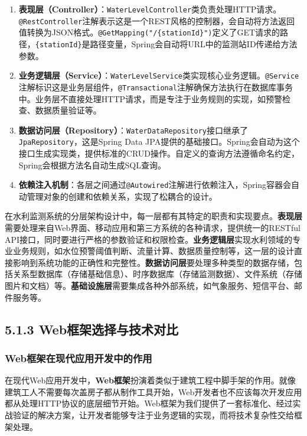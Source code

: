 \begin{enumerate}
\def\labelenumi{\arabic{enumi}.}
\item
  \textbf{表现层（Controller）}：\texttt{WaterLevelController}类负责处理HTTP请求。\texttt{@RestController}注解表示这是一个REST风格的控制器，会自动将方法返回值转换为JSON格式。\texttt{@GetMapping("/\{stationId\}")}定义了GET请求的路径，\texttt{\{stationId\}}是路径变量，Spring会自动将URL中的监测站ID传递给方法参数。
\item
  \textbf{业务逻辑层（Service）}：\texttt{WaterLevelService}类实现核心业务逻辑。\texttt{@Service}注解标识这是业务层组件，\texttt{@Transactional}注解确保方法执行在数据库事务中。业务层不直接处理HTTP请求，而是专注于业务规则的实现，如预警检查、数据质量验证等。
\item
  \textbf{数据访问层（Repository）}：\texttt{WaterDataRepository}接口继承了\texttt{JpaRepository}，这是Spring Data JPA提供的基础接口。Spring会自动为这个接口生成实现类，提供标准的CRUD操作。自定义的查询方法遵循命名约定，Spring会根据方法名自动生成SQL查询。
\item
  \textbf{依赖注入机制}：各层之间通过\texttt{@Autowired}注解进行依赖注入，Spring容器会自动管理对象的创建和依赖关系，实现了松耦合的设计。
\end{enumerate}

在水利监测系统的分层架构设计中，每一层都有其特定的职责和实现要点。\textbf{表现层}需要处理来自Web界面、移动应用和第三方系统的各种请求，提供统一的RESTful API接口，同时要进行严格的参数验证和权限检查。\textbf{业务逻辑层}实现水利领域的专业业务规则，如水位预警阈值判断、流量计算、数据质量控制等，这一层的设计直接影响到系统功能的正确性和完整性。\textbf{数据访问层}要处理多种类型的数据存储，包括关系型数据库（存储基础信息）、时序数据库（存储监测数据）、文件系统（存储图片和文档）等。\textbf{基础设施层}需要集成各种外部系统，如气象服务、短信平台、邮件服务等。

\subsection{5.1.3 Web框架选择与技术对比}\label{webux6846ux67b6ux9009ux62e9ux4e0eux6280ux672fux5bf9ux6bd4}

\subsubsection{Web框架在现代应用开发中的作用}\label{webux6846ux67b6ux5728ux73b0ux4ee3ux5e94ux7528ux5f00ux53d1ux4e2dux7684ux4f5cux7528}

在现代Web应用开发中，\textbf{Web框架}扮演着类似于建筑工程中脚手架的作用。就像建筑工人不需要每次盖房子都从制作工具开始，Web开发者也不应该每次开发应用都从处理HTTP协议的底层细节开始。Web框架为我们提供了一套标准化、经过实战验证的解决方案，让开发者能够专注于业务逻辑的实现，而将技术复杂性交给框架处理。

